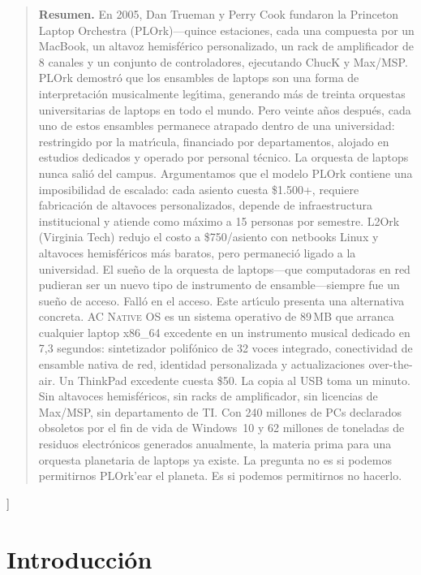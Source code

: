\documentclass[10pt,letterpaper,twocolumn]{article}
\newcommand{\acos}{\textsc{AC Native OS}}
\begin{document}
{\begin{quote}
\small\noindent\textbf{Resumen.}
En 2005, Dan Trueman y Perry Cook fundaron la Princeton Laptop Orchestra (PLOrk)---quince estaciones, cada una compuesta por un MacBook, un altavoz hemisf\'{e}rico personalizado, un rack de amplificador de 8 canales y un conjunto de controladores, ejecutando ChucK y Max/MSP. PLOrk demostr\'{o} que los ensambles de laptops son una forma de interpretaci\'{o}n musicalmente leg\'{\i}tima, generando m\'{a}s de treinta orquestas universitarias de laptops en todo el mundo. Pero veinte a\~{n}os despu\'{e}s, cada uno de estos ensambles permanece atrapado dentro de una universidad: restringido por la matr\'{\i}cula, financiado por departamentos, alojado en estudios dedicados y operado por personal t\'{e}cnico. La orquesta de laptops nunca sali\'{o} del campus. Argumentamos que el modelo PLOrk contiene una imposibilidad de escalado: cada asiento cuesta \$1.500+, requiere fabricaci\'{o}n de altavoces personalizados, depende de infraestructura institucional y atiende como m\'{a}ximo a 15 personas por semestre. L2Ork (Virginia Tech) redujo el costo a \$750/asiento con netbooks Linux y altavoces hemisf\'{e}ricos m\'{a}s baratos, pero permaneci\'{o} ligado a la universidad. El sue\~{n}o de la orquesta de laptops---que computadoras en red pudieran ser un nuevo tipo de instrumento de ensamble---siempre fue un sue\~{n}o de acceso. Fall\'{o} en el acceso. Este art\'{\i}culo presenta una alternativa concreta. \acos{} es un sistema operativo de 89\,MB que arranca cualquier laptop x86\_64 excedente en un instrumento musical dedicado en 7,3 segundos: sintetizador polif\'{o}nico de 32 voces integrado, conectividad de ensamble nativa de red, identidad personalizada y actualizaciones over-the-air. Un ThinkPad excedente cuesta \$50. La copia al USB toma un minuto. Sin altavoces hemisf\'{e}ricos, sin racks de amplificador, sin licencias de Max/MSP, sin departamento de TI. Con 240 millones de PCs declarados obsoletos por el fin de vida de Windows~10 y 62 millones de toneladas de residuos electr\'{o}nicos generados anualmente, la materia prima para una orquesta planetaria de laptops ya existe. La pregunta no es si podemos permitirnos PLOrk'ear el planeta. Es si podemos permitirnos no hacerlo.
\end{quote}
\vspace{0.5em}
}]


\section{Introducci\'{o}n}
\end{document}
